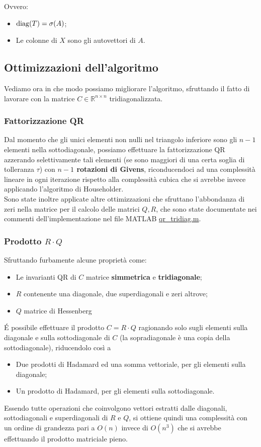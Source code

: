 Ovvero:
\begin{itemize}
	\item $\operatorname{diag}(T) = \sigma(A)$;
	\item Le colonne di $X$ sono gli autovettori di $A$.
\end{itemize}

\newpage
\subsection{Ottimizzazioni dell'algoritmo}
Vediamo ora in che modo possiamo migliorare l'algoritmo, sfruttando il fatto di 
lavorare con la matrice $C\in \mathbb{R}^{n \times n}$ tridiagonalizzata.

\subsubsection{Fattorizzazione QR}
Dal momento che gli unici elementi non nulli nel triangolo inferiore sono gli 
$n-1$ elementi nella sottodiagonale, possiamo effettuare la fattorizzazione QR 
azzerando selettivamente tali elementi (se sono maggiori di una certa soglia di 
tolleranza $\tau$) con \textbf{$n-1$ rotazioni di Givens}, riconducendoci ad una 
complessità lineare in ogni iterazione rispetto alla complessità cubica che si 
avrebbe invece applicando l'algoritmo di Householder. \\
Sono state inoltre applicate altre ottimizzazioni che sfruttano l'abbondanza di 
zeri nella matrice per il calcolo delle matrici $Q,R$, che sono state 
documentate nei commenti dell'implementazione nel file MATLAB 
\href{https://github.com/Yagotzirck/svd_benchmark/blob/main/src/qr_tridiag.m}{qr\_tridiag.m}.

\subsubsection{Prodotto $R \cdot Q$}
Sfruttando furbamente alcune proprietà come:
\begin{itemize}
	\item Le invarianti QR di $C$ matrice \textbf{simmetrica} e 
\textbf{tridiagonale};
	\item $R$ contenente una diagonale, due superdiagonali e zeri altrove;
	\item $Q$ matrice di Hessenberg
\end{itemize}

É possibile effettuare il prodotto $C = R \cdot Q$ ragionando solo sugli 
elementi sulla diagonale e sulla sottodiagonale di $C$ (la sopradiagonale è una 
copia della sottodiagonale), riducendolo così a
\begin{itemize}
	\item Due prodotti di Hadamard ed una somma vettoriale, per gli elementi sulla diagonale;
	\item Un prodotto di Hadamard, per gli elementi sulla sottodiagonale.
\end{itemize}
Essendo tutte operazioni che coinvolgono vettori estratti dalle diagonali, 
sottodiagonali e superdiagonali di $R$ e $Q$, si ottiene quindi una complessità 
con un ordine di grandezza pari a $O(n)$ invece di $O(n^3)$ che si avrebbe 
effettuando il prodotto matriciale pieno. 

